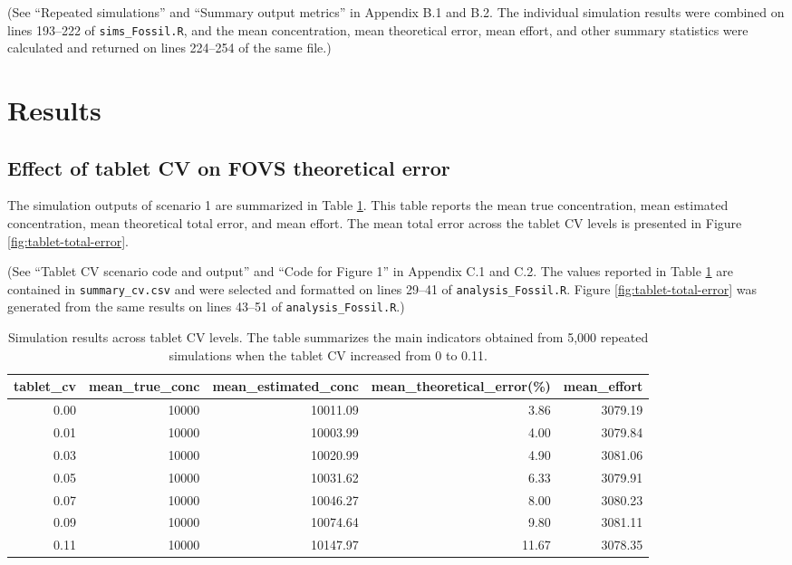 \documentclass[
  12pt,
]{article}
\begin{document}
(See ``Repeated simulations'' and ``Summary output metrics'' in Appendix
B.1 and B.2. The individual simulation results were combined on lines
193--222 of \texttt{sims\_Fossil.R}, and the mean concentration, mean
theoretical error, mean effort, and other summary statistics were
calculated and returned on lines 224--254 of the same file.)

\section{Results}\label{results}

\subsection{Effect of tablet CV on FOVS theoretical
error}\label{effect-of-tablet-cv-on-fovs-theoretical-error}

The simulation outputs of scenario 1 are summarized in Table
\ref{tab:tablet-cv-results}. This table reports the mean true
concentration, mean estimated concentration, mean theoretical total
error, and mean effort. The mean total error across the tablet CV levels
is presented in Figure \ref{fig:tablet-total-error}.

(See ``Tablet CV scenario code and output'' and ``Code for Figure 1'' in
Appendix C.1 and C.2. The values reported in Table
\ref{tab:tablet-cv-results} are contained in \texttt{summary\_cv.csv}
and were selected and formatted on lines 29--41 of
\texttt{analysis\_Fossil.R}. Figure \ref{fig:tablet-total-error} was
generated from the same results on lines 43--51 of
\texttt{analysis\_Fossil.R}.)

\begin{table}[ht!]
\centering
\small
\begin{tabular}{rrrrr}
\hline
tablet\_cv &
mean\_true\_conc &
mean\_estimated\_conc &
mean\_theoretical\_error(\%) &
mean\_effort \\
\hline
0.00 & 10000 & 10011.09 & 3.86  & 3079.19 \\
0.01 & 10000 & 10003.99 & 4.00  & 3079.84 \\
0.03 & 10000 & 10020.99 & 4.90  & 3081.06 \\
0.05 & 10000 & 10031.62 & 6.33  & 3079.91 \\
0.07 & 10000 & 10046.27 & 8.00  & 3080.23 \\
0.09 & 10000 & 10074.64 & 9.80  & 3081.11 \\
0.11 & 10000 & 10147.97 & 11.67 & 3078.35 \\
\hline
\end{tabular}
\caption{\footnotesize Simulation results across tablet CV levels. The table summarizes the main indicators obtained from 5,000 repeated simulations when the tablet CV increased from 0 to 0.11.}
\label{tab:tablet-cv-results}
\end{table}
\end{document}
